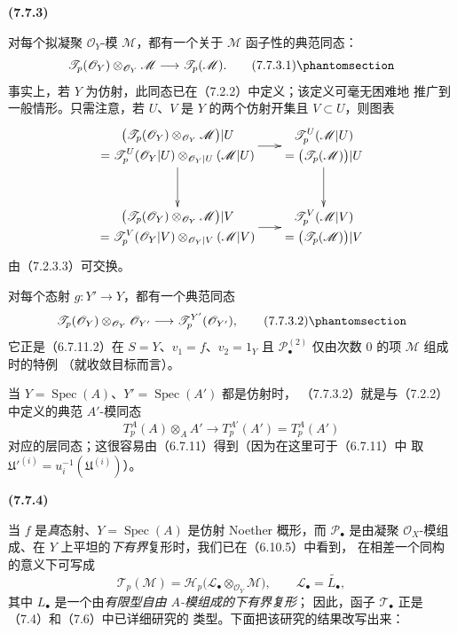 \documentclass[UTF8,fontset=none,11pt,oneside,openany]{ctexbook}
\newenvironment{env}[1][]{%
  \par\medskip\noindent\textbf{(#1)}\ %
}{\par}
\newcommand{\oldpage}[2][]{%
  \hypertarget{ega-source-page-#1-#2}{}%
  \marginnote{\scriptsize\textbf{#1}~|~#2}\ignorespaces}
\let\EGAOriginalLabel\label
\renewcommand{\label}[1]{\phantomsection\EGAOriginalLabel{#1}}
\begin{document}
\begin{env}[7.7.3]
对每个拟凝聚 $\mathscr O_Y$-模 $\mathscr M$，都有一个关于 $\mathscr M$
函子性的典范同态：
\[
  \mathscr T_p(\mathscr O_Y)\otimes_{\mathscr O_Y}\mathscr M
  \longrightarrow
  \mathscr T_p(\mathscr M).
  \tag{7.7.3.1}\label{III.7.7.3.1.fr}
\]
事实上，若 $Y$ 为仿射，此同态已在（7.2.2）中定义；该定义可毫无困难地
推广到一般情形。只需注意，若 $U$、$V$ 是 $Y$ 的两个仿射开集且
$V\subset U$，则图表
\oldpage[III]{199}
\[
\xymatrix@C=18pt@R=32pt{
  {\begin{gathered}
    \bigl(\mathscr T_p(\mathscr O_Y)
      \otimes_{\mathscr O_Y}\mathscr M\bigr)|U\\
    =\mathscr T^U_p(\mathscr O_Y|U)
      \otimes_{\mathscr O_Y|U}(\mathscr M|U)
  \end{gathered}}
  \ar[r]\ar[d]
  &
  {\begin{gathered}
    \mathscr T^U_p(\mathscr M|U)\\
    =\bigl(\mathscr T_p(\mathscr M)\bigr)|U
  \end{gathered}}
  \ar[d]
  \\
  {\begin{gathered}
    \bigl(\mathscr T_p(\mathscr O_Y)
      \otimes_{\mathscr O_Y}\mathscr M\bigr)|V\\
    =\mathscr T^V_p(\mathscr O_Y|V)
      \otimes_{\mathscr O_Y|V}(\mathscr M|V)
  \end{gathered}}
  \ar[r]
  &
  {\begin{gathered}
    \mathscr T^V_p(\mathscr M|V)\\
    =\bigl(\mathscr T_p(\mathscr M)\bigr)|V
  \end{gathered}}
}
\]
由（7.2.3.3）可交换。

对每个态射 $g:Y'\to Y$，都有一个典范同态
\[
  \mathscr T_p(\mathscr O_Y)\otimes_{\mathscr O_Y}\mathscr O_{Y'}
  \longrightarrow
  \mathscr T^{Y'}_p(\mathscr O_{Y'}),
  \tag{7.7.3.2}\label{III.7.7.3.2.fr}
\]
它正是（6.7.11.2）在 $S=Y$、$v_1=f$、$v_2=1_Y$ 且
$\mathscr P^{(2)}_\bullet$ 仅由次数 0 的项 $\mathscr M$ 组成时的特例
（就收敛目标而言）。

当 $Y=\operatorname{Spec}(A)$、$Y'=\operatorname{Spec}(A')$ 都是仿射时，
（7.7.3.2）就是与（7.2.2）中定义的典范 $A'$-模同态
\[
  T^A_p(A)\otimes_A A'
  \longrightarrow
  T^{A'}_p(A')=T^A_p(A')
\]
对应的层同态；这很容易由（6.7.11）得到（因为在这里可于（6.7.11）中
取 $\mathfrak U'^{(i)}=u_i^{-1}(\mathfrak U^{(i)})$）。
\end{env}

\begin{env}[7.7.4]
当 $f$ 是\emph{真}态射、$Y=\operatorname{Spec}(A)$ 是仿射 Noether
概形，而 $\mathscr P_\bullet$ 是由凝聚 $\mathscr O_X$-模组成、在 $Y$
上平坦的\emph{下有界}复形时，我们已在（6.10.5）中看到，
在相差一个同构的意义下可写成
\[
  \mathscr T_p(\mathscr M)
  =\mathscr H_p
    \bigl(\mathscr L_\bullet\otimes_{\mathscr O_Y}\mathscr M\bigr),
  \qquad
  \mathscr L_\bullet=\widetilde{L_\bullet},
\]
其中 $L_\bullet$ 是一个由\emph{有限型自由 $A$-模组成的下有界复形}；
因此，函子 $\mathscr T_\bullet$ 正是（7.4）和（7.6）中已详细研究的
类型。下面把该研究的结果改写出来：
\end{env}
\end{document}
